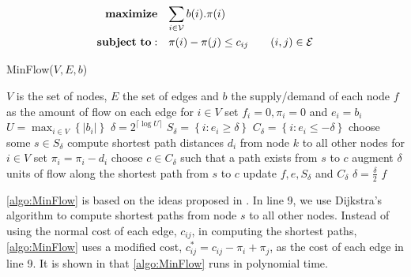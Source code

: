 \setcounter{equation}{0}
\begin{alignat}{2}
\mathbf{maximize}&\quad\mathrlap{\sum_{i \in \mathcal{V}} b(i).\pi(i)} \notag\\
\mathbf{subject\ to:}&\quad\pi(i) - \pi(j) \leq c_{ij} \quad\quad (i,j) \in \mathcal{E}
\end{alignat}

\begin{algorithm}[t]
\caption{MinFlow($V, E, b$)}
\label{algo:MinFlow}
\begin{algorithmic}[1]
\REQUIRE $V$ is the set of nodes, $E$ the set of edges and $b$ the supply/demand of each node
\ENSURE $f$ as the amount of flow on each edge
\STATE for $i \in V$ set $f_i = 0, \pi_i =0$ and $e_i = b_i$
\STATE $U = \max_{i \in V} \left\lbrace\vert b_i\vert \right\rbrace$
\STATE $\delta = 2^{ \lceil \log U \rceil }$
   \STATE $S_{\delta} = \left\lbrace i : e_i \geq \delta \right\rbrace$
   \STATE $C_{\delta} = \left\lbrace i : e_i \leq -\delta \right\rbrace$
     \STATE choose some $s \in S_{\delta}$
     \STATE compute shortest path distances $d_i$ from node $k$ to all other nodes
     \STATE for $i \in V$ set $\pi_i = \pi_i - d_i$
     \STATE choose $c \in C_{\delta}$ such that a path exists from $s$ to $c$
     \STATE augment $\delta$ units of flow along the shortest path from $s$ to $c$
     \STATE update $f, e, S_{\delta}$ and $C_{\delta}$
   \ENDWHILE
   \STATE $\delta = \frac{\delta}{2}$ 
\ENDWHILE
\RETURN $f$
\end{algorithmic}
\end{algorithm}

\cref{algo:MinFlow} is based on the ideas proposed in \cite{Edmonds72}. In line 9, we use Dijkstra's algorithm to compute shortest paths from node $s$ to all other nodes. Instead of using the normal cost of each edge, $c_{ij}$, in computing the shortest paths, \cref{algo:MinFlow} uses a modified cost, $c_{ij}^{*} = c_{ij} - \pi_i + \pi_j$, as the cost of each edge in line 9. It is shown in \cite{Edmonds72} that \cref{algo:MinFlow} runs in polynomial time.